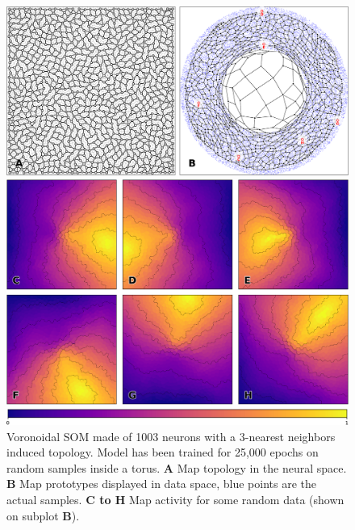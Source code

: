 \begin{figure}
  \includegraphics[width=\columnwidth]{figures/vsom-spatial-1.pdf}

  \vspace{2mm}
  
  \includegraphics[width=\columnwidth]{figures/vsom-spatial-2.pdf}

  \vspace{2mm}

  \includegraphics[width=\columnwidth]{figures/colormap.pdf}
  \caption{Voronoidal SOM made of 1003 neurons with a 3-nearest neighbors
    induced topology. Model has been trained for 25,000 epochs on random
    samples inside a torus. \textbf{A} Map topology in the neural
    space. \textbf{B} Map prototypes displayed in data space, blue points are
    the actual samples. \textbf{C to H} Map activity for some random data
    (shown on subplot \textbf{B}).}
\end{figure}

